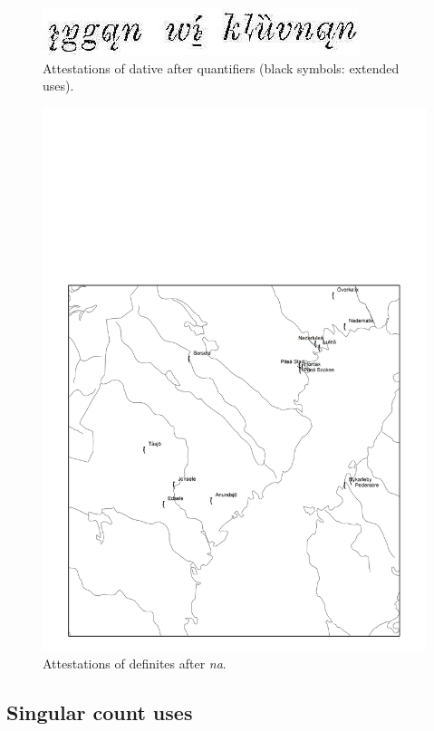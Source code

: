 \begin{figure}[h]
\includegraphics{figures_mod/image14}
\caption{Attestations of dative after quantifiers (black symbols: extended uses).}
\label{map:14}

\end{figure}

\begin{figure}[h]
\includegraphics{figures_mod/image15}
\caption{Attestations of definites after \textit{na}.}
\label{map:15}

\end{figure}

\subsection{ Singular count uses}
\label{bkm:Ref224379285}

